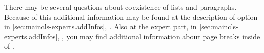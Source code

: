 \begin{Explain}
  There may be several questions about coexistence of lists and
  paragraphs. Because of this additional information may be found at the
  description of option  in
  \autoref{sec:maincls-experts.addInfos},
  . Also at the expert part,
  in \autoref{sec:maincls-experts.addInfos},
  , you may find additional
  information about page breaks inside of .%
\end{Explain}%
\fi%
%
\EndIndexGroup
%
\fi %
%
\EndIndexGroup


